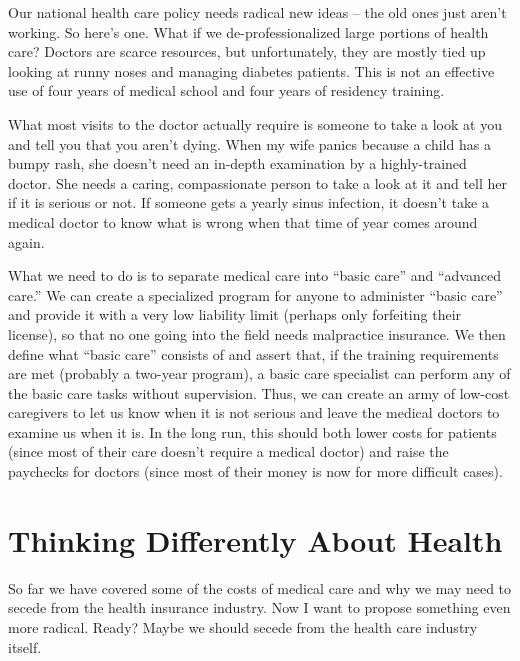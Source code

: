 \begin{policynote}
Our national health care policy needs radical new ideas – the old ones just
aren't working.  So here's one.  What if we de-professionalized
large portions of health care? Doctors
are scarce resources, but unfortunately, they are mostly tied up
looking at runny noses and managing diabetes patients. This is not an
effective use of four years of medical school and four years of
residency training.

What most visits to the doctor actually require is someone to take a
look at you and tell you that you aren't dying. When
my wife panics because a child has a bumpy rash, she
doesn't need an in-depth examination by a
highly-trained doctor. She needs a caring, compassionate person to take
a look at it and tell her if it is serious or not. If someone gets a
yearly sinus infection, it doesn't take a medical
doctor to know what is wrong when that time of year comes around again.

What we need to do is to separate medical care into ``basic
care'' and ``advanced care.'' We
can create a specialized program for anyone to administer
``basic care'' and provide it with a very low
liability limit (perhaps only forfeiting their license), so that no one
going into the field needs malpractice insurance. We then define what
``basic care'' consists of and assert that,
if the training requirements are met (probably a two-year program), a
basic care specialist can perform any of the basic care tasks without
supervision. Thus, we can create an army of low-cost caregivers to let
us know when it is not serious and leave the medical doctors to examine
us when it is. In the long run, this should both lower costs for
patients (since most of their care doesn't require a
medical doctor) and raise the paychecks for doctors (since most of
their money is now for more difficult cases).
\end{policynote}

\section{Thinking Differently About Health}

So far we have covered some of the costs of medical care and why we may
need to secede from the health insurance industry. Now I want to
propose something even more radical. Ready? Maybe
we should secede from the health care industry itself.

